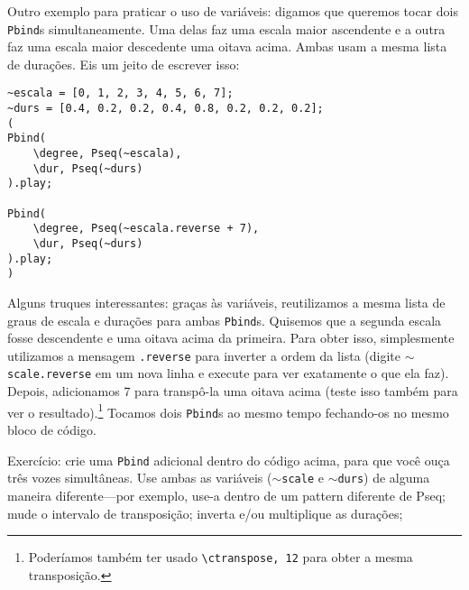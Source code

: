 Outro exemplo para praticar o uso de variáveis: digamos que queremos tocar dois \texttt{Pbind}s simultaneamente. Uma delas faz uma escala maior ascendente e a outra faz uma escala maior descedente uma oitava acima. Ambas usam a mesma lista de durações. Eis um jeito de escrever isso:

\begin{lstlisting}[style=SuperCollider-IDE, basicstyle=\scttfamily\footnotesize]
~escala = [0, 1, 2, 3, 4, 5, 6, 7];
~durs = [0.4, 0.2, 0.2, 0.4, 0.8, 0.2, 0.2, 0.2];
(
Pbind(
	\degree, Pseq(~escala),
	\dur, Pseq(~durs)
).play;

Pbind(
	\degree, Pseq(~escala.reverse + 7),
	\dur, Pseq(~durs)
).play;
)
\end{lstlisting}
 
Alguns truques interessantes: graças às variáveis, reutilizamos a mesma lista de graus de escala e durações para ambas \texttt{Pbind}s. Quisemos que a segunda escala fosse descendente e uma oitava acima da primeira. Para obter isso, simplesmente utilizamos a mensagem \texttt{.reverse} para inverter a ordem da lista (digite \texttt{$\sim$scale.reverse} em um nova linha e execute para ver exatamente o que ela faz). Depois, adicionamos 7 para transpô-la uma oitava acima (teste isso também para ver o resultado).\footnote{Poderíamos também ter usado \texttt{\textbackslash ctranspose, 12} para obter a mesma transposição.} Tocamos dois \texttt{Pbind}s ao mesmo tempo fechando-os no mesmo bloco de código.

Exercício: crie uma \texttt{Pbind} adicional dentro do código acima, para que você ouça três vozes simultâneas. Use ambas as variáveis (\texttt{$\sim$scale} e \texttt{$\sim$durs}) de alguma maneira diferente---por exemplo, use-a dentro de um pattern diferente de Pseq; mude o intervalo de transposição; inverta e/ou multiplique as durações; 
